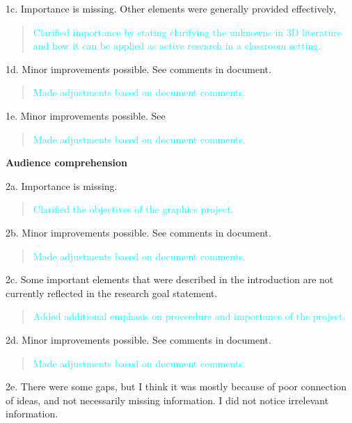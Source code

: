 \documentclass[
  12pt,
  letterpaper,
  DIV=11,
  numbers=noendperiod]{scrartcl}
\begin{document}
1c. Importance is missing. Other elements were generally provided
effectively,

\begin{quote}
\textcolor{cyan}{Clarified importance by stating clarifying the unknowns in 3D literature and how it can be applied as active research in a classroom setting.}
\end{quote}

1d. Minor improvements possible. See comments in document.

\begin{quote}
\textcolor{cyan}{Made adjustments based on document comments.}
\end{quote}

1e. Minor improvements possible. See

\begin{quote}
\textcolor{cyan}{Made adjustments based on document comments.}
\end{quote}

\textbf{Audience comprehension}

2a. Importance is missing.

\begin{quote}
\textcolor{cyan}{Clarified the objectives of the graphics project.}
\end{quote}

2b. Minor improvements possible. See comments in document.

\begin{quote}
\textcolor{cyan}{Made adjustments based on document comments.}
\end{quote}

2c. Some important elements that were described in the introduction are
not currently reflected in the research goal statement.

\begin{quote}
\textcolor{cyan}{Added additional emphasis on proceedure and importance of the project.}
\end{quote}

2d. Minor improvements possible. See comments in document.

\begin{quote}
\textcolor{cyan}{Made adjustments based on document comments.}
\end{quote}

2e. There were some gaps, but I think it was mostly because of poor
connection of ideas, and not necessarily missing information. I did not
notice irrelevant information.
\end{document}
